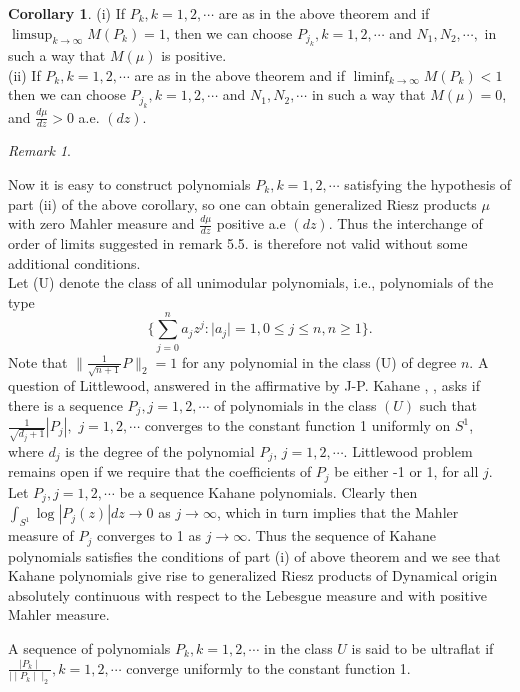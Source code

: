 \documentclass{amsart}
\theoremstyle{definition}
\newtheorem{Cor}[Th]{Corollary}
\theoremstyle{remark}
\newtheorem{rem}[Th]{Remark}
\numberwithin{equation}{section}
\newcommand{\1}{\mathbb{1}}
\begin{document}
\begin{Cor}\label{cor1}
 (i) If $P_k, k=1,2,\cdots$  are as in the above theorem and if\linebreak $\limsup_{k\rightarrow \infty} M(P_k) =1$, then we can choose $P_{j_k}, k=1,2,\cdots$ and $N_1, N_2, \cdots, $ in such a way that $M(\mu) $ is positive.\\
 (ii) If $P_k, k =1,2,\cdots$ are as in the above theorem  and  if $\liminf_{k\rightarrow \infty}M(P_k) < 1$  then we can choose $P_{j_k}, k =1,2,\cdots$ and $N_1, N_2, \cdots $ in such a way that $M(\mu) =0$, and $\frac{d\mu}{dz} > 0$ a.e. $(dz)$.

\end{Cor}

\begin{rem}\label{rem2}

  Now it is easy to construct polynomials $P_k, k=1,2,\cdots$ satisfying the hypothesis of
part (ii) of the above corollary, so one can obtain generalized Riesz products $\mu$ with
zero Mahler measure and $\frac{d\mu}{dz}$ positive a.e $(dz)$. Thus the interchange of order of limits suggested in remark 5.5. is therefore not valid without some additional conditions.\\

Let (U) denote the class of all unimodular polynomials, i.e., polynomials of the type  $$\Biggl\{\sum_{j=0}^na_jz^j: \mid a_j\mid =1, 0 \leq j\leq n, n \geq 1\Biggr\}.$$ Note that $\| \frac{1}{\sqrt {n+1}} P\|_2 =1$ for any polynomial in the class (U) of degree $n$. A question of Littlewood, answered in the affirmative by J-P. Kahane \cite{Kahane}, \cite{QS}, asks if there is a sequence $P_j, j=1,2,\cdots $ of polynomials in the class $(U)$
 such that $\frac{1}{\sqrt {d_{j}+1}}| P_j|,$ $j =1,2,\cdots$  converges to the constant function 1 uniformly on $S^1$, where $d_j$ is the degree of the polynomial $P_j$, $j =1,2,\cdots$.
 Littlewood problem remains open if we require that the coefficients of $P_j$ be either -1 or 1, for all $j$. Let $P_j, j =1,2,\cdots $ be a sequence Kahane polynomials. Clearly then $\int_{S^1}\log |P_j(z)| dz \rightarrow 0$ as $j \rightarrow \infty$, which in turn implies that the Mahler measure of $P_j$ converges to 1 as $j\rightarrow \infty$. Thus the sequence of Kahane polynomials satisfies the conditions of part (i) of above theorem and we see that
 Kahane polynomials give rise to  generalized Riesz products of Dynamical origin absolutely continuous with respect to the Lebesgue measure and with positive Mahler measure.\\

\end{rem}
 A sequence of polynomials $P_k, k=1,2,\cdots$  in the class $U$ is said to be ultraflat if  $\frac{\mid P_k\mid }{\mid\mid P_k\mid\mid_2}, k =1,2,\cdots$ converge uniformly to the constant function 1.
\end{document}
